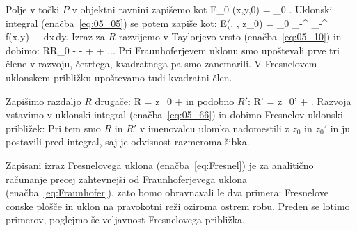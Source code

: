 Polje v točki $P$ v objektni ravnini zapišemo kot 
\beq
E_0 (x,y,0) = _0 .
\label{eq:05_65}
\eeq
Uklonski integral (enačba~\ref{eq:05_05}) se potem zapiše kot:
\beq
E(\xi, \eta, z_0) =  _0 \int_{-\infty}^{\infty}
\int_{-\infty}^{\infty} f(x,y)~~~dx\,dy.
\label{eq:05_66}
\eeq
Izraz za $R$ razvijemo v Taylorjevo vrsto (enačba~\ref{eq:05_10}) in dobimo:
\beq
R\approx R_0 -  -  +  + ...
\label{eq:05_67}
\eeq
Pri Fraunhoferjevem uklonu smo upoštevali prve tri člene v razvoju, 
četrtega, kvad\-rat\-ne\-ga pa smo zanemarili. V Fresnelovem uklonskem 
približku upoštevamo tudi kvadratni člen. 

Zapišimo razdaljo $R$ drugače:
\beq
R  =  \approx z_0 + 
\label{eq:05_75a}
\eeq
in podobno $R'$:
\beq
R'  =  \approx z_0' + .
\label{eq:05_75}
\eeq
Razvoja vstavimo v uklonski integral (enačba~\ref{eq:05_66}) in dobimo Fresnelov uklonski približek:
Pri tem smo $R$ in $R'$ v imenovalcu ulomka 
nadomestili z $z_0$ in $z_0'$ in ju postavili 
pred integral, saj je odvisnost razmeroma šibka.

Zapisani izraz Fresnelovega uklona (enačba~\ref{eq:Fresnel}) je za analitično 
računanje precej zahtevnejši od Fraunhoferjevega uklona 
(enačba~\ref{eq:Fraunhofer}), zato bomo obravnavali
le dva primera: Fresnelove conske plošče in uklon na pravokotni reži oziroma ostrem robu. Preden se lotimo primerov, poglejmo še veljavnost Fresnelovega približka.

